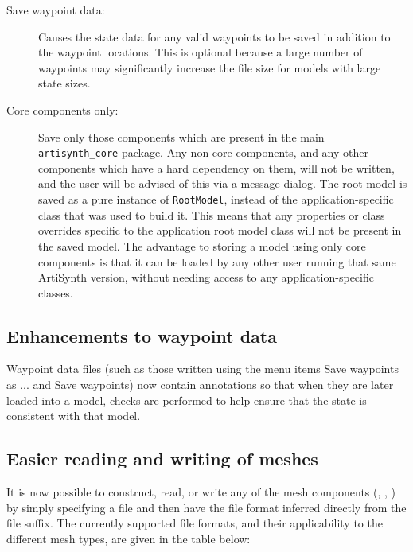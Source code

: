 \documentclass{article}
\begin{document}
\begin{description}

\item[Save waypoint data:] \mbox{}

Causes the state data for any valid waypoints to be saved in addition
to the waypoint locations.  This is optional because a large number of
waypoints may significantly increase the file size for models with
large state sizes.

\item[Core components only:] \mbox{}

Save only those components which are present in the main {\tt
artisynth\_core} package. Any non-core components, and any other
components which have a hard dependency on them, will not be written,
and the user will be advised of this via a message dialog.  The root
model is saved as a pure instance of {\tt RootModel}, instead of the
application-specific class that was used to build it. This means that
any properties or class overrides specific to the application root
model class will not be present in the saved model. The advantage to
storing a model using only core components is that it can be loaded by
any other user running that same ArtiSynth version, without needing
access to any application-specific classes.

\end{description}

\subsection*{Enhancements to waypoint data}

Waypoint data files (such as those written using the menu items {\sf
Save waypoints as ...}  and {\sf Save waypoints}) now contain
annotations so that when they are later loaded into a model, checks
are performed to help ensure that the state is consistent with that
model.

\subsection*{Easier reading and writing of meshes}

It is now possible to construct, read, or write any of the mesh
components (,
,
) by simply specifying a file
and then have the file format inferred directly from the file suffix.
The currently supported file formats, and their applicability to the
different mesh types, are given in the table below:
\end{document}

